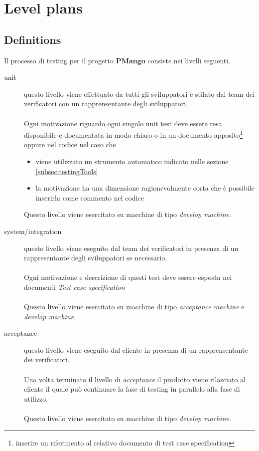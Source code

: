\section{Level plans}
\label{sec:levelPlans}
\subsection{Definitions}
\label{subsec:strategy}
Il processo di testing per il progetto \textbf{PMango} consiste nei livelli
seguenti.
\begin{description} 
\item[unit] questo livello viene effettuato da tutti gli
sviluppatori e stilato dal team dei verificatori con un rapprensentante degli
sviluppatori. 
\\ \\
Ogni motivazione riguardo ogni singolo unit test deve essere resa disponibile e
documentata in modo chiaro o in un documento apposito\footnote{inserire un
riferimento al relativo documento di test case specification} oppure nel codice
nel caso che 
\begin{itemize}
	\item viene utilizzato un strumento automatico indicato nelle sezione
	\ref{subsec:testingTools}
	\item la motivazione ha una dimensione ragionevolmente corta che \`e
	possibile inserirla come commento nel codice 
\end{itemize}

Questo livello viene esercitato su macchine di tipo \emph{develop machine}.

\item[system/integration] questo livello viene eseguito dal
team dei verificatori in presenza di un rappresentante degli sviluppatori
se necessario. 
\\ \\
Ogni motivazione e descrizione di questi test deve essere esposta nei documenti
\emph{Test case specification}
\\ \\
Questo livello viene esercitato su macchine di tipo \emph{acceptance machine} e
\emph{develop machine}.

\item[acceptance] questo livello viene eseguito dal cliente in presenza di un
rapprensentante dei verificatori.
\\ \\
Una volta terminato il livello di \emph{acceptance} il prodotto viene
rilasciato al cliente il quale pu\`o continuare la fase di testing in parallelo
alla fase di utilizzo.
\\ \\
Questo livello viene esercitato su macchine di tipo \emph{develop machine}.

\end{description}

